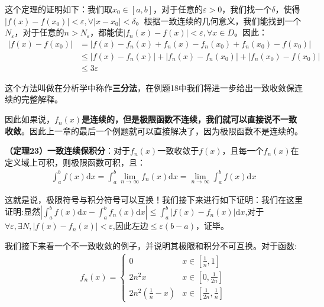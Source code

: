 \documentclass{ctexart}
\let\oldtextbf\textbf
\renewcommand{\textbf}[1]{\textcolor{brown!50!red}{\oldtextbf{#1}}}
\begin{document}
 这个定理的证明如下：我们取$x_0\in[a,b]$，对于任意的$\varepsilon>0$，我们找一个$\delta$，使得$|f(x)-f(x_0)|<\varepsilon,\forall |x-x_0|<\delta$。根据一致连续的几何意义，我们能找到一个$N_\varepsilon$，对于任意的$n>N_\varepsilon$，都能使$|f_n(x)-f(x)|<\varepsilon,\forall x\in D$。因此：
 \begin{align*} 
|f(x)-f(x_0)|&=|f(x)-f_n(x)+f_n(x)-f_n(x_0)+f_n(x_0)-f(x_0)|\\
&\leq |f(x)-f_n(x)|+|f_n(x)-f_n(x_0)|+|f_n(x_0)-f(x_0)|\\
&\leq 3\varepsilon 
\end{align*}

这个方法叫做在分析学中称作\textbf{\color{brown!50!red}三分法}，在例题18中我们将进一步给出一致收敛保连续的完整解释。

因此如果说，\textbf{\color{brown!50!red}$f_n(x)$是连续的，但是极限函数不连续，我们就可以直接说不一致收敛}。因此上一章的最后一个例题就可以直接解决了，因为极限函数不是连续的。
\begin{tcolorbox}[
    colback=bac2,     %
    colframe=fra2,   %
    coltitle=white,             %
    coltext=tex2,
    title=一致收敛保积分,
    fonttitle=\bfseries,        %
arc=3mm,                     %
breakable
]
\textbf{\color{brown!50!red}（定理23）一致连续保积分}：对于$f_n(x)$一致收敛于$f(x)$，且每一个$f_n(x)$在定义域上可积，则极限函数可积，且：
\begin{align*}
    \int_a^b f(x)\mathrm{d}x=\int_a^b \lim_{n\to\infty}f_n(x)\mathrm{d}x=\lim_{n\to\infty}\int_a^b f(x)\mathrm{d}x
\end{align*}
\end{tcolorbox}

这就是说，极限符号与积分符号可以互换！我们接下来进行如下证明：我们在这里证明:显然$|\int_a^b f(x)\mathrm{d}x-\int_a^b f_n(x)\mathrm{d}x|\leq \int_a^b |f(x)-f_n(x)|\mathrm{d}x$,对于$\forall \varepsilon,\exists N,|f(x)-f_n(x)|<\varepsilon$,因此左边$\leq \varepsilon(b-a)$，证毕。

我们接下来看一个不一致收敛的例子，并说明其极限和积分不可互换。对于函数:
\begin{align*}
    f_n(x)=\begin{cases}
        0 &x\in[\frac{1}{n},1]\\
        2n^2x &x\in[0,\frac{1}{2n}]\\
        2n^2(\frac{1}{n}-x) &x\in[\frac{1}{2n},\frac{1}{n}]
    \end{cases}
\end{align*}
\end{document}
